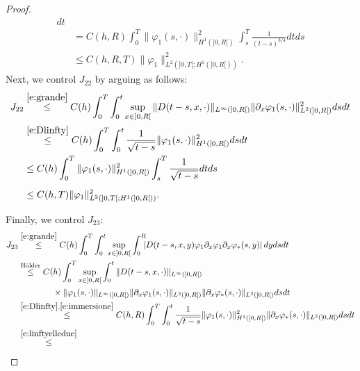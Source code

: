 \documentclass[11pt,leqno]{amsart}
\numberwithin{equation}{section}
\begin{document}
\begin{proof}
\begin{equation}
\begin{split}
    dt
    \\
    & = C(h, R) \int_0^T \| {\varphi}_1(s, \cdot) \|^2_{H^1 (]0, R[ )}
    \int_s^T \frac{1}{(t-s)^{3/4}} dt
    ds
    \\
    & \leq C(h, R, T) \| {\varphi}_1 \|^2_{L^2 (]0, T[ ;H^1 (]0, R[
      ))}. \phantom{\int}
  \end{split}
\end{equation}
Next, we control $J_{22}$ by arguing as follows: 
\begin{equation}
\label{e:geiduedue}
\begin{split}
   J_{22} 
   & \stackrel{\eqref{e:grande}}{\leq} C(h)
    \int_0^T  \int_0^t  \sup_{x \in ]0, R[}  
     \| D(t-s, x, \cdot)\|_{L^\infty(]0, R[)} 
  \| {\partial_x } {\varphi}_1 (s, \cdot)\|^2_{L^2 (]0, R[)}   ds 
  dt \\
  &  \stackrel{\eqref{e:Dlinfty}}{\leq} C(h)
   \int_0^T  
  \int_0^t   \frac{1}{\sqrt{t-s}} 
  \| {\varphi}_1 (s, \cdot)\|^2_{H^1 (]0, R[)}   ds 
   dt \\ 
   & \leq C(h) \int_0^T  \| {\varphi}_1 (s, \cdot)\|^2_{H^1 (]0, R[)} \int_s^T 
   \frac{1}{\sqrt{t-s}} dt ds 
   \\ & \leq C(h, T) \| {\varphi}_1 \|^2_{L^2 (]0, T[ ;H^1 (]0, R[ ))}. \phantom{\int} 
\end{split}
\end{equation}
Finally, we control $J_{23}$:
\begin{equation}
\label{e:geiduetre}
\begin{split}
J_{23}  & \stackrel{\eqref{e:grande}}{\leq} C(h)
\int_0^T 
  \int_0^t  \sup_{x \in ]0, R[} 
    \int_0^R \! \! \!   
  \left| D(t-s, x, y) {\varphi}_1  {\partial_x } {\varphi}_1 {\partial_x } {\varphi}_\ast (s, y)   \right| dy
   ds 
  dt \\
  &  \stackrel{\text{H\"older}}{\leq}
  C(h)
   \int_0^T \sup_{x \in ]0, R[} 
  \int_0^t \| D(t-s, x, \cdot) \|_{L^\infty(]0, R[)}  \\
  & \qquad \qquad \times 
  \| {\varphi}_1  (s, \cdot)  \|_{L^\infty(]0, R[)}  
  \| {\partial_x } {\varphi}_1 (s, \cdot) \|_{L^2(]0, R[)}
  \| {\partial_x } {\varphi}_\ast (s, \cdot)\|_{L^2(]0, R[)}   
   ds 
  dt \\
  &  \stackrel{\eqref{e:Dlinfty},\eqref{e:immersione}}{\leq}
  C(h,R)
   \int_0^T
  \int_0^t \frac{1}{\sqrt{t-s}}  
  \| {\varphi}_1  (s, \cdot)  \|^2_{H^1(]0, R[)} 
  \| {\partial_x } {\varphi}_\ast (s, \cdot)\|_{L^2(]0, R[)}   
   ds 
  dt \\
   &  \stackrel{\eqref{e:linftyelledue}}{\leq}

\end{split}
\end{equation}
\end{proof}
\end{document}
